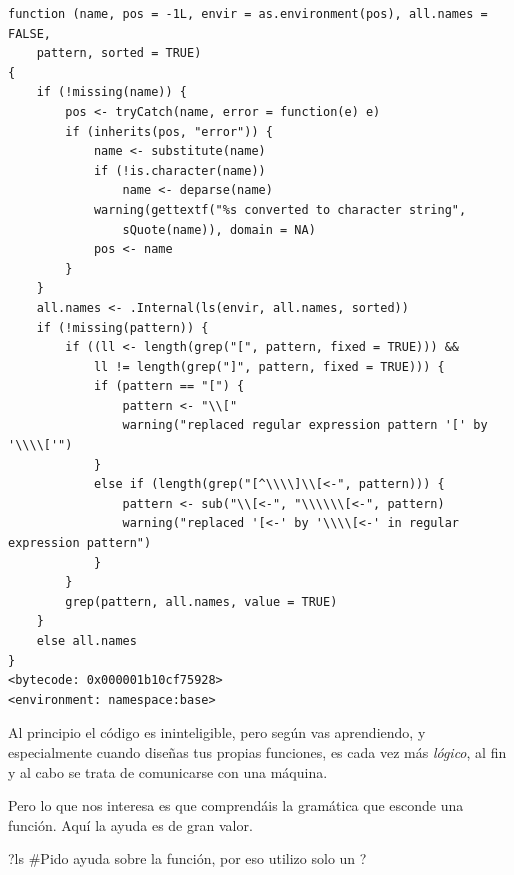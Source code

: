 \documentclass[
  letterpaper,
  DIV=11,
  numbers=noendperiod]{scrreprt}
\newenvironment{Shaded}{\begin{snugshade}}{\end{snugshade}}
\newcommand{\CommentTok}[1]{\textcolor[rgb]{0.37,0.37,0.37}{#1}}
\newcommand{\NormalTok}[1]{\textcolor[rgb]{0.00,0.23,0.31}{#1}}
\begin{document}
\begin{verbatim}
function (name, pos = -1L, envir = as.environment(pos), all.names = FALSE, 
    pattern, sorted = TRUE) 
{
    if (!missing(name)) {
        pos <- tryCatch(name, error = function(e) e)
        if (inherits(pos, "error")) {
            name <- substitute(name)
            if (!is.character(name)) 
                name <- deparse(name)
            warning(gettextf("%s converted to character string", 
                sQuote(name)), domain = NA)
            pos <- name
        }
    }
    all.names <- .Internal(ls(envir, all.names, sorted))
    if (!missing(pattern)) {
        if ((ll <- length(grep("[", pattern, fixed = TRUE))) && 
            ll != length(grep("]", pattern, fixed = TRUE))) {
            if (pattern == "[") {
                pattern <- "\\["
                warning("replaced regular expression pattern '[' by  '\\\\['")
            }
            else if (length(grep("[^\\\\]\\[<-", pattern))) {
                pattern <- sub("\\[<-", "\\\\\\[<-", pattern)
                warning("replaced '[<-' by '\\\\[<-' in regular expression pattern")
            }
        }
        grep(pattern, all.names, value = TRUE)
    }
    else all.names
}
<bytecode: 0x000001b10cf75928>
<environment: namespace:base>
\end{verbatim}

Al principio el código es ininteligible, pero según vas aprendiendo, y
especialmente cuando diseñas tus propias funciones, es cada vez más
\emph{lógico}, al fin y al cabo se trata de comunicarse con una máquina.

Pero lo que nos interesa es que comprendáis la gramática que esconde una
función. Aquí la ayuda es de gran valor.

\begin{Shaded}
\begin{Highlighting}[]
\NormalTok{ ?ls }\CommentTok{\#Pido ayuda sobre la función, por eso utilizo solo un ?}
\end{Highlighting}
\end{Shaded}
\end{document}
